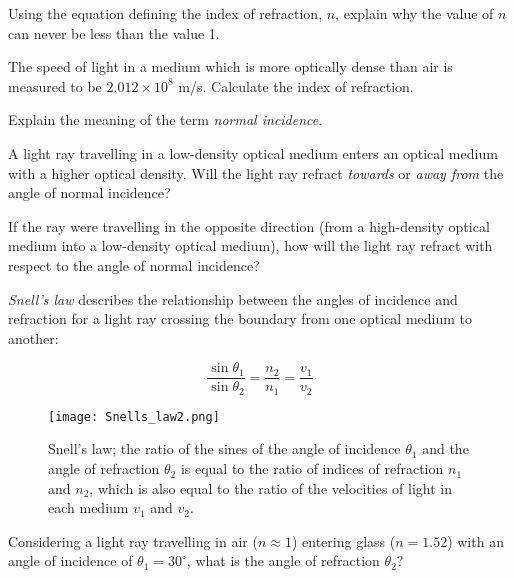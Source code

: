 \documentclass[a4paper, DIV=17]{scrartcl}
\begin{document}
\begin{question}[topic=geometric-optics]
    Using the equation defining the index of refraction, $n$, explain why
    the value of $n$ can never be less than the value 1.
\end{question}

\begin{question}
    The speed of light in a medium which is more optically dense than air is
    measured to be $2.012\times10^8$ m/s.  Calculate the index of
    refraction.
\end{question}

\begin{question}
Explain the meaning of the term \emph{normal incidence}.
\end{question}

\begin{question}
A light ray travelling in a low-density optical medium enters an optical
medium with a higher optical density.  Will the light ray refract
\emph{towards} or \emph{away from} the angle of normal incidence?

If the ray were travelling in the opposite direction (from a high-density
optical medium into a low-density optical medium), how will the light ray
refract with respect to the angle of normal incidence?
\end{question}

\begin{question}
\emph{Snell's law} describes the relationship between the angles of
incidence and refraction for a light ray crossing the boundary from one
optical medium to another:

\begin{equation}
    \frac{\sin \theta_1}{\sin \theta_2} = \frac{n_2}{n_1} = \frac{v_1}{v_2}
\end{equation}

\begin{figure}[h]
    \centerline{\texttt{[image: Snells\_law2.png]}}
    \caption{Snell's law; the ratio of the sines of the angle of incidence
    $\theta_1$ and the angle of refraction $\theta_2$ is equal to the ratio
    of indices of refraction $n_1$ and $n_2$, which is also equal to the
    ratio of the velocities of light in each medium $v_1$ and $v_2$.}
\end{figure}

    Considering a light ray travelling in air ($n \approx 1$) entering glass
    ($n = 1.52$) with an angle of incidence of $\theta_1 = 30^\circ$,
    what is the angle of refraction $\theta_2$?
\end{question}
\end{document}
